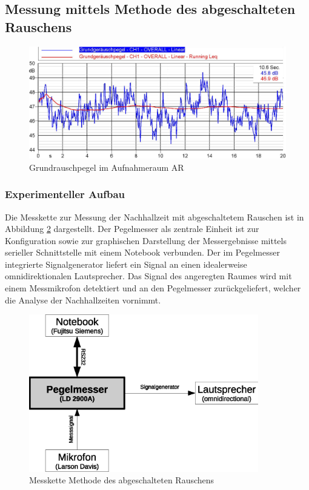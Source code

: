 \documentclass[11pt]{report}
\begin{document}
\subsection{Messung mittels Methode des abgeschalteten Rauschens}
\begin{figure}[htbp]
\begin{center}
\includegraphics[width=14cm,keepaspectratio=true]{Grundrauschpegel}
\caption{Grundrauschpegel im Aufnahmeraum AR}
\label{fig:i2geometrics}
\end{center}
\end{figure}


\subsubsection{Experimenteller Aufbau}
Die Messkette zur Messung der Nachhallzeit mit abgeschaltetem Rauschen ist in Abbildung \ref{fig:rauschaufbau} dargestellt. Der Pegelmesser als zentrale Einheit ist zur Konfiguration sowie zur graphischen Darstellung der Messergebnisse mittels serieller Schnittstelle mit einem Notebook verbunden. Der im Pegelmesser integrierte Signalgenerator liefert ein Signal an einen idealerweise omnidirektionalen Lautsprecher. Das Signal des angeregten Raumes wird mit einem Messmikrofon detektiert und an den Pegelmesser zurückgeliefert, welcher die Analyse der Nachhallzeiten vornimmt.
\begin{figure}[htbp]
\begin{center}
\includegraphics[width=10cm,keepaspectratio=true]{rauschaufbau}
\caption{Messkette Methode des abgeschalteten Rauschens}
\label{fig:rauschaufbau}
\end{center}
\end{figure}
\end{document}
